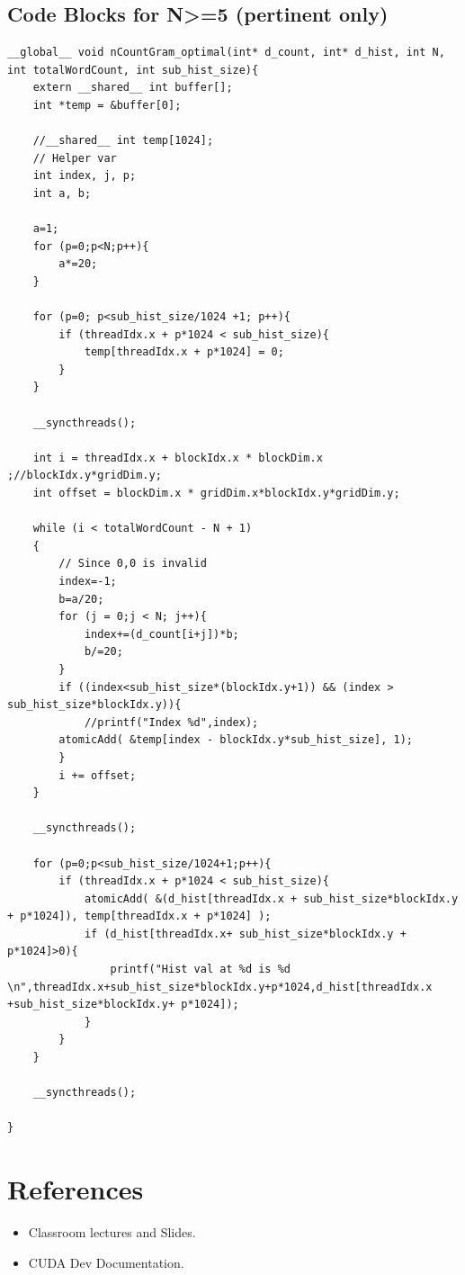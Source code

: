 \subsection {Code Blocks for N>=5 (pertinent only)}
\begin{lstlisting}
__global__ void nCountGram_optimal(int* d_count, int* d_hist, int N, int totalWordCount, int sub_hist_size){
    extern __shared__ int buffer[];
    int *temp = &buffer[0];

    //__shared__ int temp[1024];
    // Helper var
    int index, j, p;
    int a, b;

    a=1;
    for (p=0;p<N;p++){
        a*=20;
    }

    for (p=0; p<sub_hist_size/1024 +1; p++){
        if (threadIdx.x + p*1024 < sub_hist_size){
            temp[threadIdx.x + p*1024] = 0;
        }
    }

    __syncthreads();

    int i = threadIdx.x + blockIdx.x * blockDim.x ;//blockIdx.y*gridDim.y;
    int offset = blockDim.x * gridDim.x*blockIdx.y*gridDim.y;

    while (i < totalWordCount - N + 1)
    {
        // Since 0,0 is invalid
        index=-1;
        b=a/20;
        for (j = 0;j < N; j++){
            index+=(d_count[i+j])*b;
            b/=20;
        }
        if ((index<sub_hist_size*(blockIdx.y+1)) && (index > sub_hist_size*blockIdx.y)){
            //printf("Index %d",index);
        atomicAdd( &temp[index - blockIdx.y*sub_hist_size], 1);
        }
        i += offset;
    }

    __syncthreads();

    for (p=0;p<sub_hist_size/1024+1;p++){
        if (threadIdx.x + p*1024 < sub_hist_size){
            atomicAdd( &(d_hist[threadIdx.x + sub_hist_size*blockIdx.y + p*1024]), temp[threadIdx.x + p*1024] );
            if (d_hist[threadIdx.x+ sub_hist_size*blockIdx.y + p*1024]>0){
                printf("Hist val at %d is %d \n",threadIdx.x+sub_hist_size*blockIdx.y+p*1024,d_hist[threadIdx.x +sub_hist_size*blockIdx.y+ p*1024]);
            }
        }
    }

    __syncthreads();

}

\end{lstlisting}
\bigskip

\section{References}
\begin{itemize}
\item Classroom lectures and Slides.
\item CUDA Dev Documentation.
\end{itemize}

